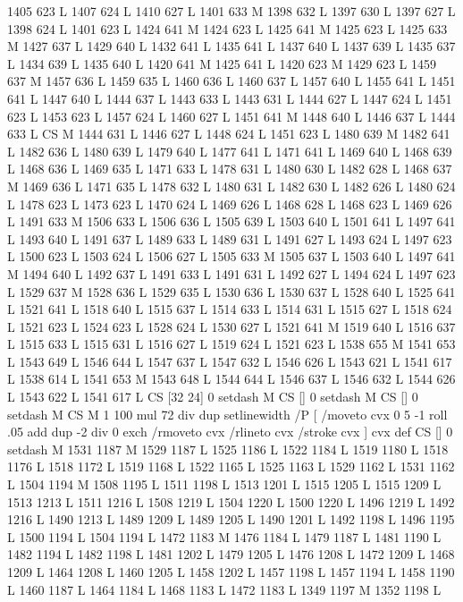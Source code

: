 {{{{{{{{{{{{{{{{{{{{{{{{{{{{{{1405 623 L
1407 624 L
1410 627 L
1401 633 M 1398 632 L
1397 630 L
1397 627 L
1398 624 L
1401 623 L
1424 641 M 1424 623 L
1425 641 M 1425 623 L
1425 633 M 1427 637 L
1429 640 L
1432 641 L
1435 641 L
1437 640 L
1437 639 L
1435 637 L
1434 639 L
1435 640 L
1420 641 M 1425 641 L
1420 623 M 1429 623 L
1459 637 M 1457 636 L
1459 635 L
1460 636 L
1460 637 L
1457 640 L
1455 641 L
1451 641 L
1447 640 L
1444 637 L
1443 633 L
1443 631 L
1444 627 L
1447 624 L
1451 623 L
1453 623 L
1457 624 L
1460 627 L
1451 641 M 1448 640 L
1446 637 L
1444 633 L
CS M
1444 631 L
1446 627 L
1448 624 L
1451 623 L
1480 639 M 1482 641 L
1482 636 L
1480 639 L
1479 640 L
1477 641 L
1471 641 L
1469 640 L
1468 639 L
1468 636 L
1469 635 L
1471 633 L
1478 631 L
1480 630 L
1482 628 L
1468 637 M 1469 636 L
1471 635 L
1478 632 L
1480 631 L
1482 630 L
1482 626 L
1480 624 L
1478 623 L
1473 623 L
1470 624 L
1469 626 L
1468 628 L
1468 623 L
1469 626 L
1491 633 M 1506 633 L
1506 636 L
1505 639 L
1503 640 L
1501 641 L
1497 641 L
1493 640 L
1491 637 L
1489 633 L
1489 631 L
1491 627 L
1493 624 L
1497 623 L
1500 623 L
1503 624 L
1506 627 L
1505 633 M 1505 637 L
1503 640 L
1497 641 M 1494 640 L
1492 637 L
1491 633 L
1491 631 L
1492 627 L
1494 624 L
1497 623 L
1529 637 M 1528 636 L
1529 635 L
1530 636 L
1530 637 L
1528 640 L
1525 641 L
1521 641 L
1518 640 L
1515 637 L
1514 633 L
1514 631 L
1515 627 L
1518 624 L
1521 623 L
1524 623 L
1528 624 L
1530 627 L
1521 641 M 1519 640 L
1516 637 L
1515 633 L
1515 631 L
1516 627 L
1519 624 L
1521 623 L
1538 655 M 1541 653 L
1543 649 L
1546 644 L
1547 637 L
1547 632 L
1546 626 L
1543 621 L
1541 617 L
1538 614 L
1541 653 M 1543 648 L
1544 644 L
1546 637 L
1546 632 L
1544 626 L
1543 622 L
1541 617 L
CS [32 24] 0 setdash M
CS [] 0 setdash M
CS [] 0 setdash M
CS M 1 100 mul 72 div dup setlinewidth
/P [ /moveto cvx 0 5 -1 roll .05 add dup -2 div 0 exch /rmoveto cvx /rlineto cvx /stroke cvx ] cvx def
CS [] 0 setdash M
1531 1187 M 1529 1187 L
1525 1186 L
1522 1184 L
1519 1180 L
1518 1176 L
1518 1172 L
1519 1168 L
1522 1165 L
1525 1163 L
1529 1162 L
1531 1162 L
1504 1194 M 1508 1195 L
1511 1198 L
1513 1201 L
1515 1205 L
1515 1209 L
1513 1213 L
1511 1216 L
1508 1219 L
1504 1220 L
1500 1220 L
1496 1219 L
1492 1216 L
1490 1213 L
1489 1209 L
1489 1205 L
1490 1201 L
1492 1198 L
1496 1195 L
1500 1194 L
1504 1194 L
1472 1183 M 1476 1184 L
1479 1187 L
1481 1190 L
1482 1194 L
1482 1198 L
1481 1202 L
1479 1205 L
1476 1208 L
1472 1209 L
1468 1209 L
1464 1208 L
1460 1205 L
1458 1202 L
1457 1198 L
1457 1194 L
1458 1190 L
1460 1187 L
1464 1184 L
1468 1183 L
1472 1183 L
1349 1197 M 1352 1198 L
}}}}}}}}}}}}}}}}}}}}}}}}}}}}}}

